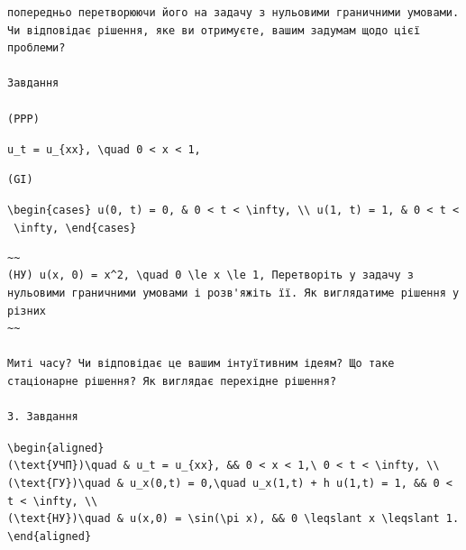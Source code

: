 \documentclass[
  ukrainian,
]{article}
\begin{document}
\begin{verbatim}
попередньо перетворюючи його на задачу з нульовими граничними умовами. Чи відповідає рішення, яке ви отримуєте, вашим задумам щодо цієї проблеми?

Завдання

(PPP)
\end{verbatim}

\texttt{u\_t\ =\ u\_\{xx\},\ \textbackslash{}quad\ 0\ \textless{}\ x\ \textless{}\ 1,}

\begin{verbatim}
(GI)
\end{verbatim}

\texttt{\textbackslash{}begin\{cases\}\ u(0,\ t)\ =\ 0,\ \&\ 0\ \textless{}\ t\ \textless{}\ \textbackslash{}infty,\ \textbackslash{}\textbackslash{}\ u(1,\ t)\ =\ 1,\ \&\ 0\ \textless{}\ t\ \textless{}\ \textbackslash{}infty,\ \textbackslash{}end\{cases\}}

\begin{verbatim}
~~
(НУ) u(x, 0) = x^2, \quad 0 \le x \le 1, Перетворіть у задачу з нульовими граничними умовами і розв'яжіть її. Як виглядатиме рішення у різних
~~

Миті часу? Чи відповідає це вашим інтуїтивним ідеям? Що таке стаціонарне рішення? Як виглядає перехідне рішення?

3. Завдання
\end{verbatim}

\texttt{\textbackslash{}begin\{aligned\}}
\texttt{(\textbackslash{}text\{УЧП\})\textbackslash{}quad\ \&\ u\_t\ =\ u\_\{xx\},\ \&\&\ 0\ \textless{}\ x\ \textless{}\ 1,\textbackslash{}\ 0\ \textless{}\ t\ \textless{}\ \textbackslash{}infty,\ \textbackslash{}\textbackslash{}}
\texttt{(\textbackslash{}text\{ГУ\})\textbackslash{}quad\ \&\ u\_x(0,t)\ =\ 0,\textbackslash{}quad\ u\_x(1,t)\ +\ h\ u(1,t)\ =\ 1,\ \&\&\ 0\ \textless{}\ t\ \textless{}\ \textbackslash{}infty,\ \textbackslash{}\textbackslash{}}
\texttt{(\textbackslash{}text\{НУ\})\textbackslash{}quad\ \&\ u(x,0)\ =\ \textbackslash{}sin(\textbackslash{}pi\ x),\ \&\&\ 0\ \textbackslash{}leqslant\ x\ \textbackslash{}leqslant\ 1.}
\texttt{\textbackslash{}end\{aligned\}}
\end{document}
